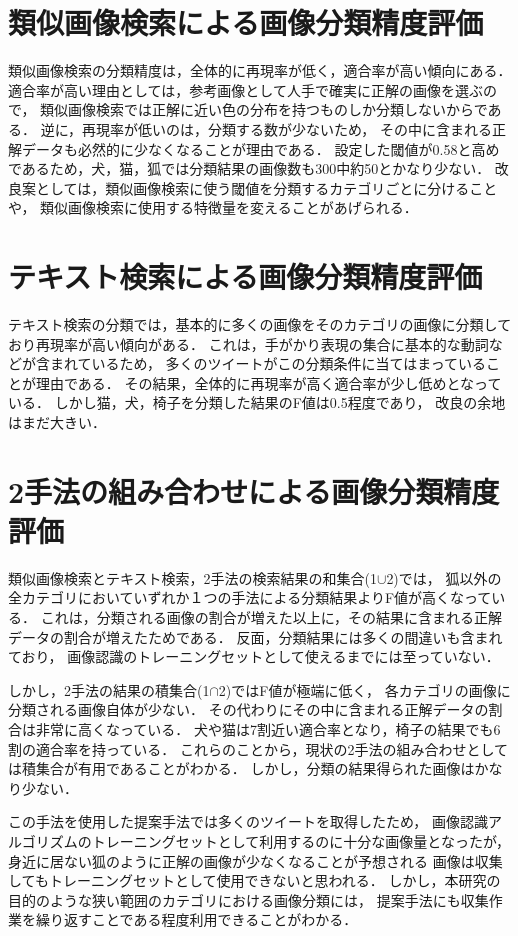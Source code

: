 \documentclass{deimj}
\begin{document}
\section{類似画像検索による画像分類精度評価}
類似画像検索の分類精度は，全体的に再現率が低く，適合率が高い傾向にある．
適合率が高い理由としては，参考画像として人手で確実に正解の画像を選ぶので，
類似画像検索では正解に近い色の分布を持つものしか分類しないからである．
逆に，再現率が低いのは，分類する数が少ないため，
その中に含まれる正解データも必然的に少なくなることが理由である．
設定した閾値が0.58と高めであるため，犬，猫，狐では分類結果の画像数も300中約50とかなり少ない．
改良案としては，類似画像検索に使う閾値を分類するカテゴリごとに分けることや，
類似画像検索に使用する特徴量を変えることがあげられる．

\section{テキスト検索による画像分類精度評価}

テキスト検索の分類では，基本的に多くの画像をそのカテゴリの画像に分類しており再現率が高い傾向がある．
これは，手がかり表現の集合に基本的な動詞などが含まれているため，
多くのツイートがこの分類条件に当てはまっていることが理由である．
その結果，全体的に再現率が高く適合率が少し低めとなっている．
しかし猫，犬，椅子を分類した結果のF値は0.5程度であり，
改良の余地はまだ大きい．

\section{2手法の組み合わせによる画像分類精度評価}
類似画像検索とテキスト検索，2手法の検索結果の和集合(1$\cup$2)では，
狐以外の全カテゴリにおいていずれか１つの手法による分類結果よりF値が高くなっている．
これは，分類される画像の割合が増えた以上に，その結果に含まれる正解データの割合が増えたためである．
反面，分類結果には多くの間違いも含まれており，
画像認識のトレーニングセットとして使えるまでには至っていない．

しかし，2手法の結果の積集合(1$\cap$2)ではF値が極端に低く，
各カテゴリの画像に分類される画像自体が少ない．
その代わりにその中に含まれる正解データの割合は非常に高くなっている．
犬や猫は7割近い適合率となり，椅子の結果でも6割の適合率を持っている．
これらのことから，現状の2手法の組み合わせとしては積集合が有用であることがわかる．
しかし，分類の結果得られた画像はかなり少ない．

この手法を使用した提案手法では多くのツイートを取得したため，
画像認識アルゴリズムのトレーニングセットとして利用するのに十分な画像量となったが，
身近に居ない狐のように正解の画像が少なくなることが予想される
画像は収集してもトレーニングセットとして使用できないと思われる．
しかし，本研究の目的のような狭い範囲のカテゴリにおける画像分類には，
提案手法にも収集作業を繰り返すことである程度利用できることがわかる．
\end{document}
